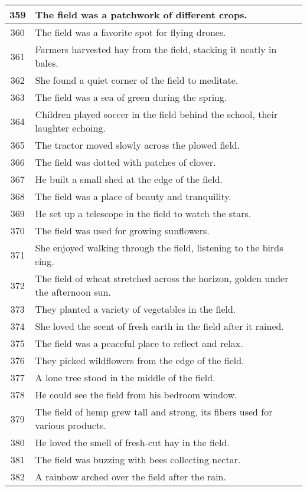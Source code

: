 \begin{longtable}{|c|p{12cm}|}
359 & The field was a patchwork of different crops. \\ \hline
360 & The field was a favorite spot for flying drones. \\ \hline
361 & Farmers harvested hay from the field, stacking it neatly in bales. \\ \hline
362 & She found a quiet corner of the field to meditate. \\ \hline
363 & The field was a sea of green during the spring. \\ \hline
364 & Children played soccer in the field behind the school, their laughter echoing. \\ \hline
365 & The tractor moved slowly across the plowed field. \\ \hline
366 & The field was dotted with patches of clover. \\ \hline
367 & He built a small shed at the edge of the field. \\ \hline
368 & The field was a place of beauty and tranquility. \\ \hline
369 & He set up a telescope in the field to watch the stars. \\ \hline
370 & The field was used for growing sunflowers. \\ \hline
371 & She enjoyed walking through the field, listening to the birds sing. \\ \hline
372 & The field of wheat stretched across the horizon, golden under the afternoon sun. \\ \hline
373 & They planted a variety of vegetables in the field. \\ \hline
374 & She loved the scent of fresh earth in the field after it rained. \\ \hline
375 & The field was a peaceful place to reflect and relax. \\ \hline
376 & They picked wildflowers from the edge of the field. \\ \hline
377 & A lone tree stood in the middle of the field. \\ \hline
378 & He could see the field from his bedroom window. \\ \hline
379 & The field of hemp grew tall and strong, its fibers used for various products. \\ \hline
380 & He loved the smell of fresh-cut hay in the field. \\ \hline
381 & The field was buzzing with bees collecting nectar. \\ \hline
382 & A rainbow arched over the field after the rain. \\ \hline

\end{longtable}
